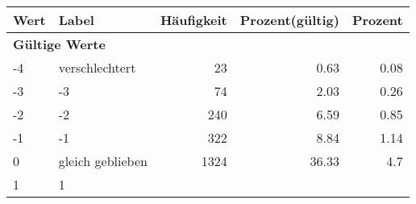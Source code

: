      \begin{longtable}{lXrrr}
     \toprule
     \textbf{Wert} & \textbf{Label} & \textbf{Häufigkeit} & \textbf{Prozent(gültig)} & \textbf{Prozent} \\
     \endhead
     \midrule
     \multicolumn{5}{l}{\textbf{Gültige Werte}}\\

     -4 &
     \multicolumn{1}{X}{ verschlechtert   } &


       \num{23} &
       \num[round-mode=places,round-precision=2]{0.63} &
         \num[round-mode=places,round-precision=2]{0.08} \\

     -3 &
     \multicolumn{1}{X}{ -3   } &


       \num{74} &
       \num[round-mode=places,round-precision=2]{2.03} &
         \num[round-mode=places,round-precision=2]{0.26} \\

     -2 &
     \multicolumn{1}{X}{ -2   } &


       \num{240} &
       \num[round-mode=places,round-precision=2]{6.59} &
         \num[round-mode=places,round-precision=2]{0.85} \\

     -1 &
     \multicolumn{1}{X}{ -1   } &


       \num{322} &
       \num[round-mode=places,round-precision=2]{8.84} &
         \num[round-mode=places,round-precision=2]{1.14} \\

     0 &
     \multicolumn{1}{X}{ gleich geblieben   } &


       \num{1324} &
       \num[round-mode=places,round-precision=2]{36.33} &
         \num[round-mode=places,round-precision=2]{4.7} \\

     1 &
     \multicolumn{1}{X}{ 1   } &



\end{longtable}
